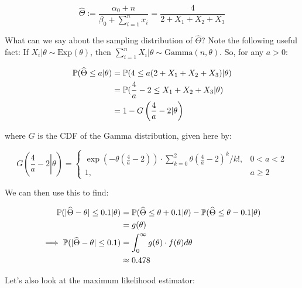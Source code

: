 \documentclass[a4paper]{article}
\begin{document}
                \[
                    \widehat \Theta := \frac{\alpha_0 + n}{\beta_0 +
                    \sum\limits_{i=1}^n x_i} = \frac{4}{2 + X_1 + X_2 + X_3}
                \]

                What can we say about the sampling distribution of $\widehat
                \Theta$? Note the following useful fact: If $X_i | \theta \sim
                \text{Exp}(\theta)$, then $\sum\limits_{i=1}^n X_i | \theta \sim
                \text{Gamma}(n, \theta)$. So, for any $a > 0$:

                \begin{align*}
                    \mathbb{P}(\widehat \Theta \leq a | \theta) & = \mathbb{P}(4 \leq a
                        (2 + X_1 + X_2 + X_3) | \theta) \\
                    & = \mathbb{P}(\frac{4}{a} - 2 \leq X_1 + X_2 + X_3 | \theta) \\
                    & = 1 - G\left(\frac{4}{a} - 2 | \theta\right)
                \end{align*}

                where $G$ is the CDF of the Gamma distribution, given here by:

                \[
                    G\left(\left.\frac{4}{a} - 2 \right| \theta\right) =
                    \begin{cases}\exp\left(-\theta\left(\frac{4}{a} - 2\right)
                    \right) \cdot \sum_{k=0}^2 \theta\left(\frac{4}{a} - 2
                    \right)^k / k!, & 0 < a < 2 \\ 1, & a \geq 2\end{cases}
                \]

                We can then use this to find:

                \begin{align*}
                    \mathbb{P}(|\widehat \Theta - \theta| \leq 0.1 | \theta) & =
                        \mathbb{P}(\widehat \Theta \leq \theta + 0.1 | \theta) -
                        \mathbb{P}(\widehat \Theta \leq \theta - 0.1 | \theta) \\
                    & = g(\theta) \\
                    \implies \mathbb{P}(|\widehat \Theta - \theta| \leq 0.1) & =
                        \int_0^\infty g(\theta) \cdot f(\theta) d\theta \\
                    & \approx 0.478
                \end{align*}

                Let's also look at the maximum likelihood estimator:
\end{document}
